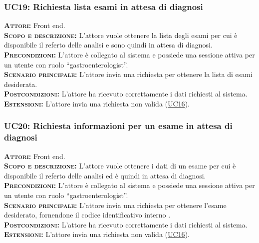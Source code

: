 \subsubsection{UC19: Richiesta lista esami in attesa di diagnosi}
\label{sec:UC19}
\textsc{\textbf{Attori:}} Front end.\\
\textsc{\textbf{Scopo e descrizione:}} L'attore vuole ottenere la lista degli esami per cui è disponibile il referto delle analisi e sono quindi in attesa di diagnosi.\\
\textsc{\textsc{\textbf{Precondizioni:}}} L'attore è collegato al sistema e possiede una sessione attiva per un utente con ruolo ``gastroenterologist''.\\
\textsc{\textbf{Scenario principale:}} L'attore invia una richiesta per ottenere la lista di esami desiderata.\\
\textsc{\textbf{Postcondizioni:}} L'attore ha ricevuto correttamente i dati richiesti al sistema.\\
\textsc{\textbf{Estensioni:}} L'attore invia una richiesta non valida (\hyperref[sec:UC16]{UC16}).

\subsubsection{UC20: Richiesta informazioni per un esame in attesa di diagnosi}
\label{sec:UC20}
\textsc{\textbf{Attori:}} Front end.\\
\textsc{\textbf{Scopo e descrizione:}} L'attore vuole ottenere i dati di un esame  per cui è disponibile il referto delle analisi ed è quindi in attesa di diagnosi.\\
\textsc{\textsc{\textbf{Precondizioni:}}} L'attore è collegato al sistema e possiede una sessione attiva per un utente con ruolo ``gastroenterologist''.\\
\textsc{\textbf{Scenario principale:}}  L'attore invia una richiesta per ottenere l'esame desiderato, fornendone il codice identificativo interno .\\
\textsc{\textbf{Postcondizioni:}} L'attore ha ricevuto correttamente i dati richiesti al sistema.\\
\textsc{\textbf{Estensioni:}} L'attore invia una richiesta non valida (\hyperref[sec:UC16]{UC16}).

